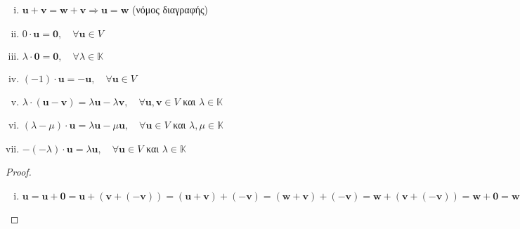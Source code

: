 \begin{thm}
\item {}
    \begin{enumerate}[i)]
        \item $ \mathbf{u} + \mathbf{v} = \mathbf{w} + \mathbf{v} 
            \Rightarrow \mathbf{u} = \mathbf{w} $ \quad (νόμος διαγραφής)
        \item $ 0 \cdot \mathbf{u} = \mathbf{0}, \quad \forall \mathbf{u} \in V $
        \item $ \lambda \cdot \mathbf{0} = \mathbf{0}, \quad \forall \lambda \in 
            \mathbb{K} $
        \item $ (-1)\cdot \mathbf{u} = - \mathbf{u}, \quad \forall \mathbf{u} \in V $ 
        \item $ \lambda \cdot (\mathbf{u} - \mathbf{v}) = 
            \lambda \mathbf{u} - \lambda \mathbf{v}, \quad \forall \mathbf{u}, 
            \mathbf{v} \in V $ και $ \lambda \in \mathbb{K} $
        \item $ (\lambda - \mu ) \cdot \mathbf{u} = \lambda \mathbf{u} - 
            \mu \mathbf{u}, \quad \forall \mathbf{u} \in V $ και $ \lambda, 
            \mu \in \mathbb{K} $
        \item $ -(- \lambda ) \cdot \mathbf{u} = \lambda \mathbf{u}, 
            \quad \forall \mathbf{u} \in V $ και $ \lambda \in \mathbb{K} $
    \end{enumerate}
\end{thm}
\begin{proof}
\item {}
    \begin{enumerate}[i)]
        \item $ \mathbf{u} = \mathbf{u} + \mathbf{0} = \mathbf{u} + 
            (\mathbf{v} + (- \mathbf{v})) = (\mathbf{u} + \mathbf{v}) + (- \mathbf{v}) =
            (\mathbf{w} + \mathbf{v}) + (- \mathbf{v}) = \mathbf{w} + 
            (\mathbf{v} + (- \mathbf{v})) = \mathbf{w} + \mathbf{0} = \mathbf{w}$
    \end{enumerate}
\end{proof}




